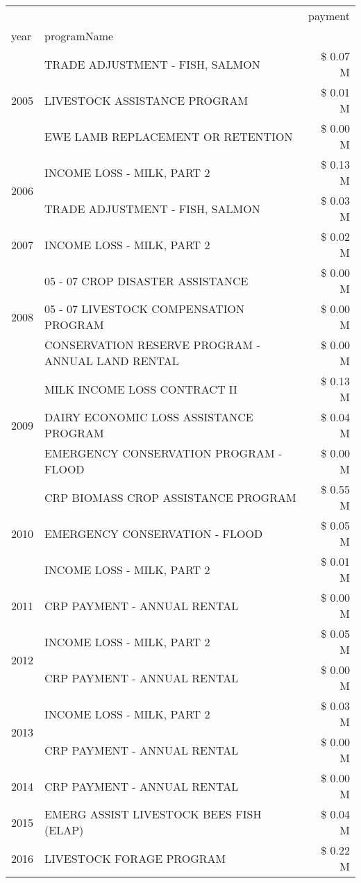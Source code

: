 \begin{tabular}{llr}
\toprule
 &  & payment \\
year & programName &  \\
\midrule
\multirow[t]{3}{*}{2005} & TRADE ADJUSTMENT - FISH, SALMON & \$ 0.07 M \\
 & LIVESTOCK ASSISTANCE PROGRAM & \$ 0.01 M \\
 & EWE LAMB REPLACEMENT OR RETENTION & \$ 0.00 M \\
\cline{1-3}
\multirow[t]{2}{*}{2006} & INCOME LOSS - MILK, PART 2 & \$ 0.13 M \\
 & TRADE ADJUSTMENT - FISH, SALMON & \$ 0.03 M \\
\cline{1-3}
2007 & INCOME LOSS - MILK, PART 2 & \$ 0.02 M \\
\cline{1-3}
\multirow[t]{3}{*}{2008} & 05 - 07 CROP DISASTER ASSISTANCE & \$ 0.00 M \\
 & 05 - 07 LIVESTOCK COMPENSATION PROGRAM & \$ 0.00 M \\
 & CONSERVATION RESERVE PROGRAM - ANNUAL LAND RENTAL & \$ 0.00 M \\
\cline{1-3}
\multirow[t]{3}{*}{2009} & MILK INCOME LOSS CONTRACT II & \$ 0.13 M \\
 & DAIRY ECONOMIC LOSS ASSISTANCE PROGRAM & \$ 0.04 M \\
 & EMERGENCY CONSERVATION PROGRAM - FLOOD & \$ 0.00 M \\
\cline{1-3}
\multirow[t]{3}{*}{2010} & CRP BIOMASS CROP ASSISTANCE PROGRAM & \$ 0.55 M \\
 & EMERGENCY CONSERVATION - FLOOD & \$ 0.05 M \\
 & INCOME LOSS - MILK, PART 2 & \$ 0.01 M \\
\cline{1-3}
2011 & CRP PAYMENT - ANNUAL RENTAL & \$ 0.00 M \\
\cline{1-3}
\multirow[t]{2}{*}{2012} & INCOME LOSS - MILK, PART 2 & \$ 0.05 M \\
 & CRP PAYMENT - ANNUAL RENTAL & \$ 0.00 M \\
\cline{1-3}
\multirow[t]{2}{*}{2013} & INCOME LOSS - MILK, PART 2 & \$ 0.03 M \\
 & CRP PAYMENT - ANNUAL RENTAL & \$ 0.00 M \\
\cline{1-3}
2014 & CRP PAYMENT - ANNUAL RENTAL & \$ 0.00 M \\
\cline{1-3}
2015 & EMERG ASSIST LIVESTOCK BEES FISH (ELAP) & \$ 0.04 M \\
\cline{1-3}
\multirow[t]{3}{*}{2016} & LIVESTOCK FORAGE PROGRAM & \$ 0.22 M \\

\end{tabular}
